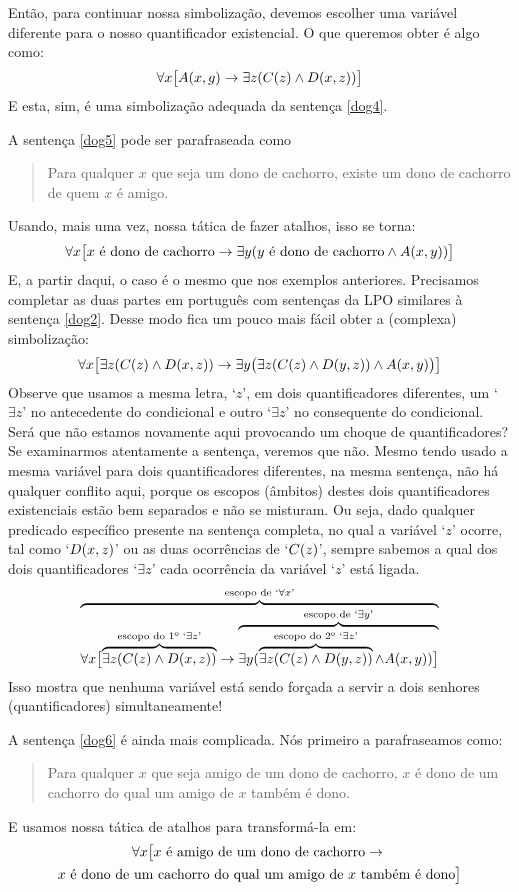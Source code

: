 Então, para continuar nossa simbolização, devemos escolher uma variável diferente para o nosso quantificador existencial. O que queremos obter é algo como:
$$\forall x\bigl[\mathord{A}(x,g) \rightarrow\exists z(\mathord{C}(z) \wedge \mathord{D}(x,z))\bigr]$$
E esta, sim, é uma simbolização adequada da sentença \ref{dog4}.

A sentença \ref{dog5} pode ser parafraseada como
\begin{quote}
	Para qualquer $x$ que seja um dono de cachorro, existe um dono de cachorro de quem $x$ é amigo.	
\end{quote}
Usando, mais uma vez, nossa tática de fazer atalhos, isso se torna:
$$\forall x\bigl[\mbox{$x$ é dono de cachorro}\rightarrow\exists y(\mbox{$y$ é dono de cachorro}\wedge \mathord{A}(x,y))\bigr]$$
E, a partir daqui, o caso é o mesmo que nos exemplos anteriores.
Precisamos completar as duas partes em português com sentenças da LPO similares à sentença \ref{dog2}.
Desse modo fica um pouco mais fácil obter a (complexa) simbolização:
$$\forall x\bigl[\exists z(\mathord{C}(z) \wedge \mathord{D}(x,z))\rightarrow\exists y\bigl(\exists z(\mathord{C}(z) \wedge \mathord{D}(y,z))\wedge \mathord{A}(x,y)\bigr)\bigr]$$
Observe que usamos a mesma letra, `$z$', em dois quantificadores diferentes, um `$\exists z$' no antecedente do condicional e outro `$\exists z$' no consequente do condicional.
Será que não estamos novamente aqui provocando um choque de quantificadores? 
Se examinarmos atentamente a sentença, veremos que não.
Mesmo tendo usado a mesma variável para dois quantificadores diferentes, na mesma sentença, não há qualquer conflito aqui, porque os escopos (âmbitos) destes dois quantificadores existenciais estão bem separados e não se misturam.
Ou seja, dado qualquer predicado específico presente na sentença completa, no qual a variável `$z$' ocorre, tal como `$\mathord{D}(x,z)$' ou as duas ocorrências de `$\mathord{C}(z)$', sempre sabemos a qual dos dois quantificadores `$\exists z$' cada ocorrência da variável `$z$' está ligada.
$$\overbrace{\forall x\bigl[\overbrace{\exists z(\mathord{C}(z) \wedge \mathord{D}(x,z))}^{\text{escopo do 1º `}\exists z\text{'}}\rightarrow \overbrace{\exists y(\overbrace{\exists z(\mathord{C}(z) \wedge \mathord{D}(y,z))}^{\text{escopo do 2º `}\exists z\text{'}}\wedge \mathord{A}(x,y))\bigr]}^{\text{escopo de `}\exists y\text{'}}}^{\text{escopo de `}\forall x\text{'}}$$
Isso mostra que nenhuma variável está sendo forçada a servir a dois senhores (quantificadores) simultaneamente!

A sentença \ref{dog6} é ainda mais complicada.
Nós primeiro a parafraseamos como:
\begin{quote}
	Para qualquer $x$ que seja amigo de um dono de cachorro, $x$ é dono de um cachorro do qual um amigo de $x$ também é dono.
\end{quote}
E usamos nossa tática de atalhos para transformá-la em:
\footnotesize
\begin{multline*}
\forall x\bigl[x\text{ é amigo de um dono de cachorro}\rightarrow {}\\
x\text{ é dono de um cachorro do qual um amigo de $x$ também é dono}\bigr]
\end{multline*}

